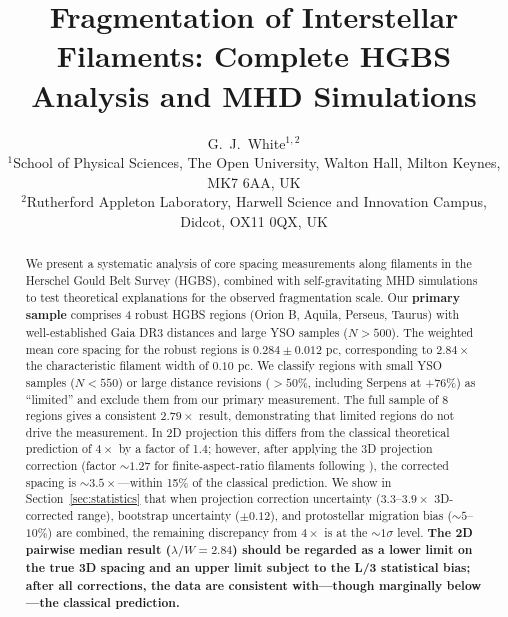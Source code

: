 \documentclass[twoside,twocolumn]{mnras}
\title{Fragmentation of Interstellar Filaments: Complete HGBS Analysis and MHD Simulations}
\author[G.~J.~White]{G.~J.~White$^{1,2}$\\
$^{1}$School of Physical Sciences, The Open University, Walton Hall, Milton Keynes, MK7 6AA, UK\\
$^{2}$Rutherford Appleton Laboratory, Harwell Science and Innovation Campus, Didcot, OX11 0QX, UK}
\begin{document}
\maketitle

\begin{abstract}
We present a systematic analysis of core spacing measurements along filaments in the Herschel Gould Belt Survey (HGBS), combined with self-gravitating MHD simulations to test theoretical explanations for the observed fragmentation scale. Our \textbf{primary sample} comprises 4 robust HGBS regions (Orion B, Aquila, Perseus, Taurus) with well-established Gaia DR3 distances and large YSO samples ($N > 500$). The weighted mean core spacing for the robust regions is $0.284 \pm 0.012$ pc, corresponding to $2.84\times$ the characteristic filament width of $0.10$ pc. We classify regions with small YSO samples ($N < 550$) or large distance revisions ($>50\%$, including Serpens at +76\%) as ``limited'' and exclude them from our primary measurement. The full sample of 8 regions gives a consistent $2.79\times$ result, demonstrating that limited regions do not drive the measurement. In 2D projection this differs from the classical theoretical prediction of $4\times$ by a factor of 1.4; however, after applying the 3D projection correction (factor $\sim1.27$ for finite-aspect-ratio filaments following \citealt{Hacar2013}), the corrected spacing is $\sim3.5\times$---within 15\% of the classical prediction. We show in Section~\ref{sec:statistics} that when projection correction uncertainty ($3.3$--$3.9\times$ 3D-corrected range), bootstrap uncertainty ($\pm0.12$), and protostellar migration bias ($\sim5$--$10\%$) are combined, the remaining discrepancy from $4\times$ is at the $\sim1\sigma$ level. \textbf{The 2D pairwise median result ($\lambda/W = 2.84$) should be regarded as a lower limit on the true 3D spacing and an upper limit subject to the L/3 statistical bias; after all corrections, the data are consistent with---though marginally below---the classical prediction.}


\end{abstract}
\end{document}
